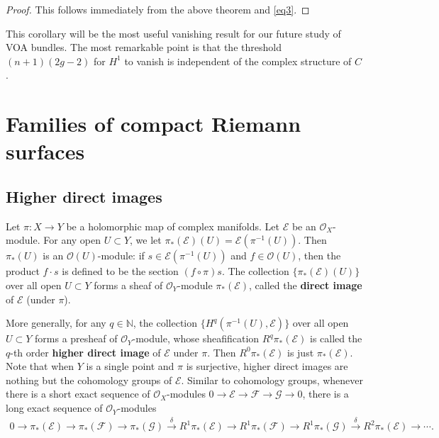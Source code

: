 \documentclass[12pt,a4paper,notitlepage]{report}
\theoremstyle{definition}
\theoremstyle{plain}
\newcommand{\scr}{\mathscr}
\numberwithin{equation}{section}
\begin{document}
\begin{proof}
This follows immediately from the above theorem and \eqref{eq3}.
\end{proof}

This corollary will be the most useful vanishing result for our future study of VOA bundles. The most remarkable point   is that  the threshold $(n+1)(2g-2)$ for $H^1$ to vanish  is independent of the complex structure of $C$.


\section{Families of compact Riemann surfaces}\label{lb1}


\subsection*{Higher direct images}

Let $\pi:X\rightarrow Y$ be a holomorphic map of complex manifolds. Let $\scr E$ be an $\scr O_{X}$-module. For any open $ U\subset Y$, we let $\pi_*(\scr E)( U)=\scr E(\pi^{-1}( U))$. Then $\pi_*( U)$ is an $\scr O( U)$-module: if $s\in\scr E(\pi^{-1}( U))$ and $f\in\scr O( U)$, then the product $f\cdot s$ is defined to be the section $(f\circ\pi)s$. The collection $\{\pi_*(\scr E)( U)\}$ over all open $ U\subset Y$ forms a sheaf of $\scr O_{Y}$-module $\pi_*(\scr E)$, called the \textbf{direct image} of $\scr E$ (under $\pi$). 

More generally, for any $q\in\mathbb N$, the collection $\{H^q(\pi^{-1}( U),\scr E)\}$ over all open $ U\subset Y$ forms a presheaf of $\scr O_{Y}$-module, whose sheafification $R^q\pi_*(\scr E)$ \index{Rq@$R^q\pi_*(\scr E)$, $\pi_*(\scr E)$} is called the $q$-th order \textbf{higher direct image} of $\scr E$ under $\pi$. Then $R^0\pi_*(\scr E)$ is just $\pi_*(\scr E)$.  Note that when $Y$ is a single point and $\pi$ is surjective, higher direct images are nothing but the cohomology groups of $\scr E$. Similar to cohomology groups, whenever there is a short exact sequence of $\scr O_{X}$-modules $0\rightarrow\scr E\rightarrow\scr F\rightarrow\scr G\rightarrow 0$, there is a long exact sequence of $\scr O_{Y}$-modules
\begin{align}
0\rightarrow \pi_*(\scr E)\rightarrow\pi_*(\scr F)\rightarrow\pi_*(\scr G)\xrightarrow{\delta} R^1\pi_*(\scr E)\rightarrow R^1\pi_*(\scr F)\rightarrow R^1\pi_*(\scr G)\xrightarrow{\delta} R^2\pi_*(\scr E)\rightarrow\cdots.\label{eq4}
\end{align}
\end{document}
